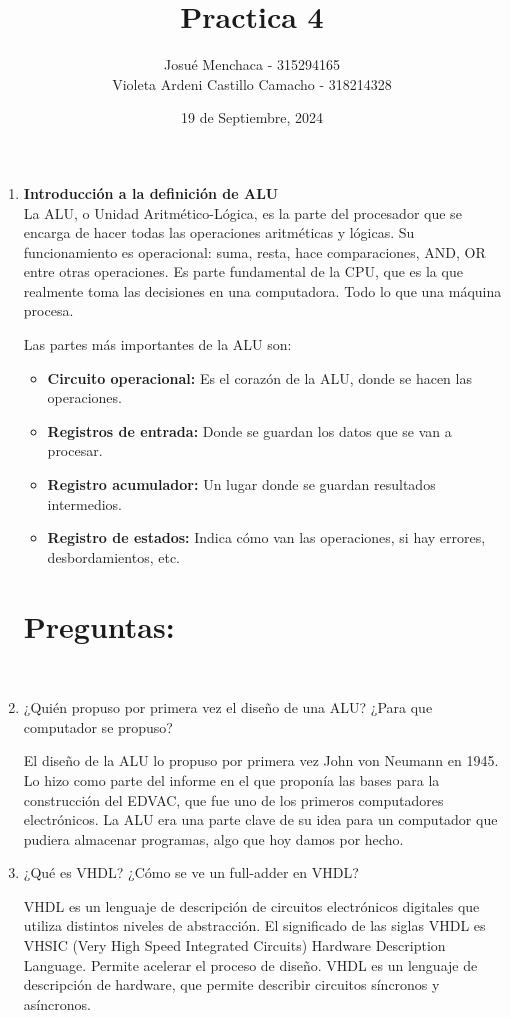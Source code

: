\documentclass{article}
\title{Practica 4}
\author{Josué Menchaca - 315294165 \\ Violeta Ardeni Castillo Camacho - 318214328}
\date{19 de Septiembre, 2024}
\begin{document}
\maketitle

\begin{enumerate}
    \item \textbf{Introducción a la definición de ALU} \\
    La ALU, o Unidad Aritmético-Lógica, es la parte del procesador que se encarga de hacer todas las operaciones aritméticas y lógicas. Su funcionamiento es operacional: suma, resta, hace comparaciones, AND, OR entre otras operaciones.
    Es parte fundamental de la CPU, que es la que realmente toma las decisiones en una computadora. Todo lo que una máquina procesa.
    
    Las partes más importantes de la ALU son:
    \begin{itemize}
        \item \textbf{Circuito operacional:} Es el corazón de la ALU, donde se hacen las operaciones.
        \item \textbf{Registros de entrada:} Donde se guardan los datos que se van a procesar.
        \item \textbf{Registro acumulador:} Un lugar donde se guardan resultados intermedios.
        \item \textbf{Registro de estados:} Indica cómo van las operaciones, si hay errores, desbordamientos, etc.
    \end{itemize}

\section{Preguntas:} \\

\item ¿Quién propuso por primera vez el diseño de una ALU? ¿Para que computador se propuso? 

El diseño de la ALU lo propuso por primera vez John von Neumann en 1945. Lo hizo como parte del informe en el que proponía las bases para la construcción del EDVAC, que fue uno de los primeros computadores electrónicos. La ALU era una parte clave de su idea para un computador que pudiera almacenar programas, algo que hoy damos por hecho.


\item ¿Qué es VHDL? ¿Cómo se ve un full-adder en VHDL? 

VHDL es un lenguaje de descripción de circuitos electrónicos digitales que utiliza distintos niveles de abstracción. El significado de las siglas VHDL es VHSIC (Very High Speed Integrated Circuits) Hardware Description Language. 
Permite acelerar el proceso de diseño. VHDL es un lenguaje de descripción de hardware, que permite describir circuitos síncronos y asíncronos.



\end{enumerate}
\end{document}
